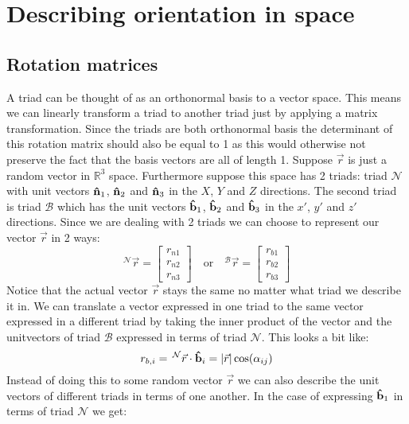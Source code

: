 \documentclass[11pt, a4paper]{article}
\newcommand*{\R}{\ensuremath{\mathbb{R}}}
\DeclareRobustCommand{\uvec}[1]{{%
  \ifcat\relax\noexpand#1%
    \bm{\hat{#1}}%
  \else
    \ifcsname uvec#1\endcsname
      \csname uvec#1\endcsname
    \else
      \bm{\hat{\mathbf{#1}}}%
     \fi
   \fi
}}
\numberwithin{equation}{section}
\numberwithin{figure}{section}
\begin{document}
\setcounter{section}{4}
\section{Describing orientation in space}
\subsection{Rotation matrices}
A triad can be thought of as an orthonormal basis to a vector space. This means we can linearly transform a triad to another triad just by applying a matrix transformation. Since the triads are both orthonormal basis the determinant of this rotation matrix should also be equal to 1 as this would otherwise not preserve the fact that the basis vectors are all of length 1. Suppose $\vec{r}$ is just a random vector in $\R^3$ space. Furthermore suppose this space has 2 triads: triad $\mathcal{N}$ with unit vectors $\uvec{n}_1$, $\uvec{n}_2$ and $\uvec{n}_3$ in the $X$, $Y$ and $Z$ directions. The second triad is triad $\mathcal{B}$ which has the unit vectors $\uvec{b}_1$, $\uvec{b}_2$ and $\uvec{b}_3$ in the $x'$, $y'$ and $z'$ directions. Since we are dealing with 2 triads we can choose to represent our vector $\vec{r}$ in 2 ways:
\begin{equation}
  ^\mathcal{N}\vec{r} = 
  \begin{bmatrix}
    r_{n1}\\
    r_{n2}\\
    r_{n3}
  \end{bmatrix}
  \quad \text{or} \quad
  ^\mathcal{B}\vec{r} = 
  \begin{bmatrix}
    r_{b1}\\
    r_{b2}\\
    r_{b3}
  \end{bmatrix}
\end{equation}
Notice that the actual vector $\vec{r}$ stays the same no matter what triad we describe it in. We can translate a vector expressed in one triad to the same vector expressed in a different triad by taking the inner product of the vector and the unitvectors of triad $\mathcal{B}$ expressed in terms of triad $\mathcal{N}$. This looks a bit like:
\begin{equation}
  r_{b,i} = \,^\mathcal{N}\vec{r} \cdot \uvec{b}_i = |\vec{r}|\cos(\alpha_{ij})
\end{equation}
Instead of doing this to some random vector $\vec{r}$ we can also describe the unit vectors of different triads in terms of one another. In the case of expressing $\uvec{b}_1$  in terms of triad $\mathcal{N}$ we get:
\end{document}

